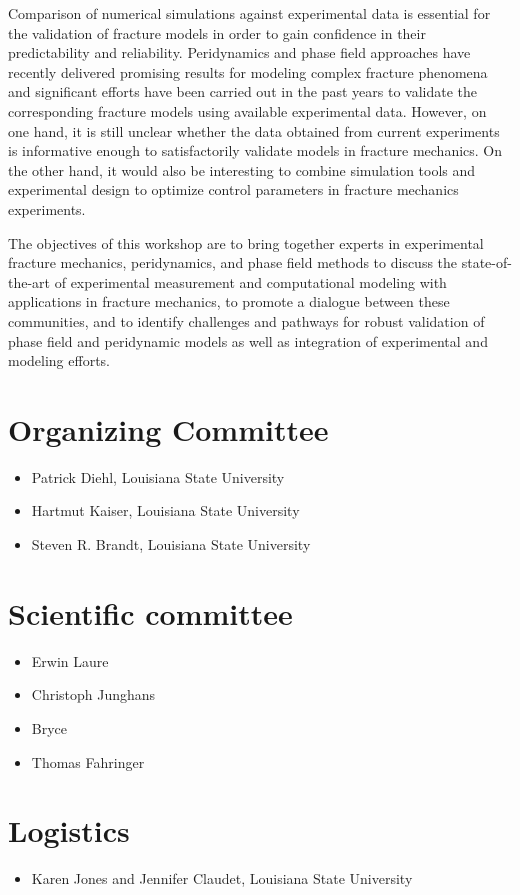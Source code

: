 Comparison of numerical simulations against experimental data is essential
for the validation of fracture models in order to gain confidence in their
predictability and reliability. Peridynamics and phase field approaches have recently
delivered promising results for modeling complex fracture phenomena and significant
efforts have been carried out in the past years to validate the corresponding
fracture models using available experimental data. However, on one hand, it is still
unclear whether the data obtained from current experiments is informative enough to
satisfactorily validate models in fracture mechanics. On the other hand, it would also be
interesting to combine simulation tools and experimental design to optimize
control parameters in fracture mechanics experiments.

The objectives of this workshop are to bring together experts in experimental fracture mechanics,
peridynamics, and phase field methods to discuss the state-of-the-art of experimental
measurement and computational modeling with applications in fracture mechanics, to promote
a dialogue between these communities, and to identify challenges and pathways for robust validation
of phase field and peridynamic models as well as integration of experimental and modeling efforts.

\section*{Organizing Committee}
\begin{itemize}
\item Patrick Diehl, Louisiana State University
\item Hartmut Kaiser, Louisiana State University
\item Steven R. Brandt, Louisiana State University
\end{itemize}

\section*{Scientific committee}
\begin{itemize}
\item Erwin Laure
\item Christoph Junghans
\item Bryce 
\item Thomas Fahringer 
\end{itemize}

\section*{Logistics}
\begin{itemize}
\item Karen Jones and Jennifer Claudet, Louisiana State University
\end{itemize}
